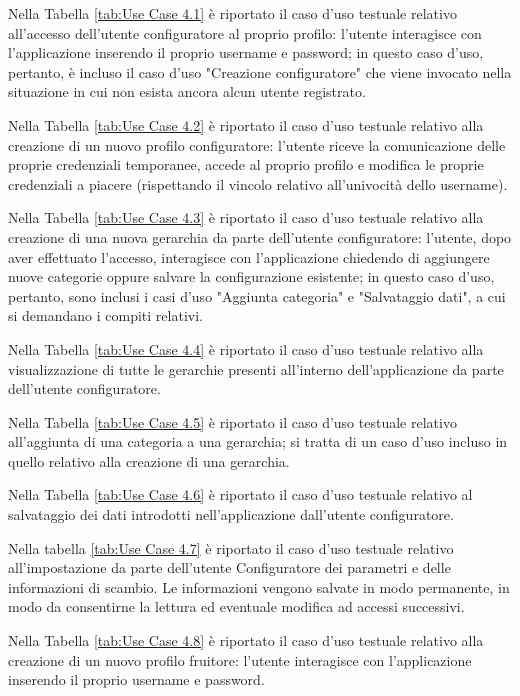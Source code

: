 Nella Tabella \ref{tab:Use Case 4.1} è riportato il caso d'uso testuale relativo all'accesso dell'utente configuratore al proprio profilo: l'utente interagisce con l'applicazione inserendo il proprio username e password; in questo caso d'uso, pertanto, è incluso il caso d'uso "Creazione configuratore" che viene invocato nella situazione in cui non esista ancora alcun utente registrato.\bigskip

Nella Tabella \ref{tab:Use Case 4.2} è riportato il caso d'uso testuale relativo alla creazione di un nuovo profilo configuratore: l'utente riceve la comunicazione delle proprie credenziali temporanee, accede al proprio profilo e modifica le proprie credenziali a piacere (rispettando il vincolo relativo all'univocità dello username).\bigskip

Nella Tabella \ref{tab:Use Case 4.3} è riportato il caso d'uso testuale relativo alla creazione di una nuova gerarchia da parte dell'utente configuratore: l'utente, dopo aver effettuato l'accesso, interagisce con l'applicazione chiedendo di aggiungere nuove categorie oppure salvare la configurazione esistente; in questo caso d'uso, pertanto, sono inclusi i casi d'uso "Aggiunta categoria" e "Salvataggio dati", a cui si demandano i compiti relativi.\bigskip

Nella Tabella \ref{tab:Use Case 4.4} è riportato il caso d'uso testuale relativo alla visualizzazione di tutte le gerarchie presenti all'interno dell'applicazione da parte dell'utente configuratore.\bigskip

Nella Tabella \ref{tab:Use Case 4.5} è riportato il caso d'uso testuale relativo all'aggiunta di una categoria a una gerarchia; si tratta di un caso d'uso incluso in quello relativo alla creazione di una gerarchia.\bigskip

Nella Tabella \ref{tab:Use Case 4.6} è riportato il caso d'uso testuale relativo al salvataggio dei dati introdotti nell'applicazione dall'utente configuratore.\bigskip

Nella tabella \ref{tab:Use Case 4.7} è riportato il caso d'uso testuale relativo all'impostazione da parte dell'utente Configuratore dei parametri e delle informazioni di scambio. Le informazioni vengono salvate in modo permanente, in modo da consentirne la lettura ed eventuale modifica ad accessi successivi.\bigskip

Nella Tabella \ref{tab:Use Case 4.8} è riportato il caso d'uso testuale relativo alla creazione di un nuovo profilo fruitore: l'utente interagisce con l'applicazione inserendo il proprio username e password.\bigskip

